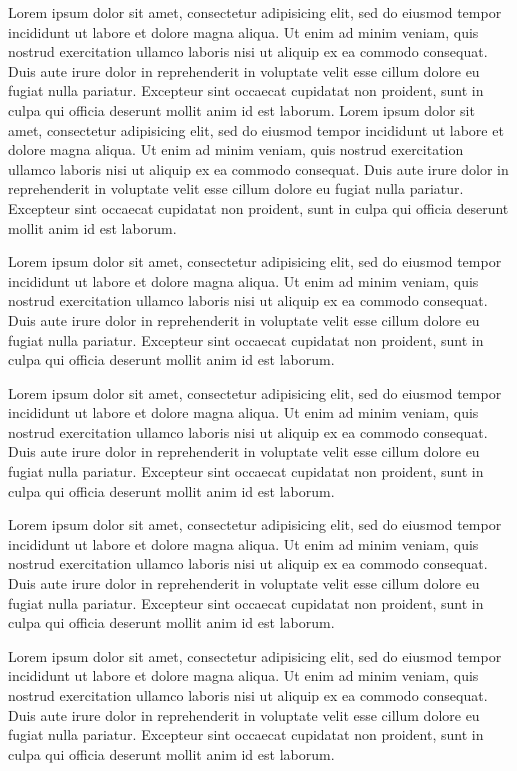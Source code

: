 Lorem ipsum dolor sit amet, consectetur adipisicing elit, sed do eiusmod
tempor incididunt ut labore et dolore magna aliqua. Ut enim ad minim
veniam, quis nostrud exercitation ullamco laboris nisi ut aliquip ex ea
commodo consequat. Duis aute irure dolor in reprehenderit in voluptate
velit esse cillum dolore eu fugiat nulla pariatur. Excepteur sint
occaecat cupidatat non proident, sunt in culpa qui officia deserunt
mollit anim id est laborum.
Lorem ipsum dolor sit amet, consectetur adipisicing elit, sed do eiusmod
tempor incididunt ut labore et dolore magna aliqua. Ut enim ad minim
veniam, quis nostrud exercitation ullamco laboris nisi ut aliquip ex ea
commodo consequat. Duis aute irure dolor in reprehenderit in voluptate
velit esse cillum dolore eu fugiat nulla pariatur. Excepteur sint
occaecat cupidatat non proident, sunt in culpa qui officia deserunt
mollit anim id est laborum.


Lorem ipsum dolor sit amet, consectetur adipisicing elit, sed do eiusmod
tempor incididunt ut labore et dolore magna aliqua. Ut enim ad minim
veniam, quis nostrud exercitation ullamco laboris nisi ut aliquip ex ea
commodo consequat. Duis aute irure dolor in reprehenderit in voluptate
velit esse cillum dolore eu fugiat nulla pariatur. Excepteur sint
occaecat cupidatat non proident, sunt in culpa qui officia deserunt
mollit anim id est laborum.

Lorem ipsum dolor sit amet, consectetur adipisicing elit, sed do eiusmod
tempor incididunt ut labore et dolore magna aliqua. Ut enim ad minim
veniam, quis nostrud exercitation ullamco laboris nisi ut aliquip ex ea
commodo consequat. Duis aute irure dolor in reprehenderit in voluptate
velit esse cillum dolore eu fugiat nulla pariatur. Excepteur sint
occaecat cupidatat non proident, sunt in culpa qui officia deserunt
mollit anim id est laborum.

Lorem ipsum dolor sit amet, consectetur adipisicing elit, sed do eiusmod
tempor incididunt ut labore et dolore magna aliqua. Ut enim ad minim
veniam, quis nostrud exercitation ullamco laboris nisi ut aliquip ex ea
commodo consequat. Duis aute irure dolor in reprehenderit in voluptate
velit esse cillum dolore eu fugiat nulla pariatur. Excepteur sint
occaecat cupidatat non proident, sunt in culpa qui officia deserunt
mollit anim id est laborum.

Lorem ipsum dolor sit amet, consectetur adipisicing elit, sed do eiusmod tempor incididunt ut labore et dolore magna aliqua. Ut enim ad minim veniam, quis nostrud exercitation ullamco laboris nisi ut aliquip ex ea commodo consequat. Duis aute irure dolor in reprehenderit in voluptate velit esse cillum dolore eu fugiat nulla pariatur. Excepteur sint occaecat cupidatat non proident, sunt in culpa qui officia deserunt mollit anim id est laborum.

